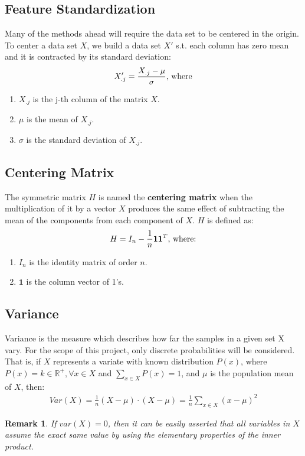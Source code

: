\documentclass[12pt]{report}
\newtheorem{remark}{Remark}[section]
\begin{document}
\subsection{Feature Standardization}
Many of the methods ahead will require the data set to be centered in the origin. To center a data set $X$, we build a data set $X'$ s.t. each column has zero mean and it is contracted by its standard deviation:
$$X'_{.j} = \frac{X_{.j} - \mu}{\sigma} \textnormal{, where}$$
\begin{enumerate}
	\item $X_{.j}$ is the j-th column of the matrix $X$.
	\item $\mu$ is the mean of $X_{.j}$.
	\item $\sigma$ is the standard deviation of $X_{.j}$.
\end{enumerate}

\subsection{Centering Matrix}
The symmetric matrix $H$ is named the \textbf{centering matrix} when the multiplication of it by a vector $X$ produces the same effect of subtracting the mean of the components from each component of $X$. $H$ is defined as:
$$
H = I_n - \frac{1}{n}\textbf{11}^T \textnormal{, where:}
$$
\begin{enumerate}
	\item $I_n$ is the identity matrix of order $n$.
	\item $\textbf{1}$ is the column vector of 1's.
\end{enumerate}

\subsection{Variance}
Variance is the measure which describes how far the samples in a given set X vary. For the scope of this project, only discrete probabilities will be considered. That is, if $X$ represents a variate with known distribution $P(x)$, where $P(x) = k \in \mathbb{R}^{+}, \forall x \in X$ and $\sum_{x \in X} P(x) = 1$, and $\mu$ is the population mean of $X$, then: \cite{ross2010introductory}
\begin{align*}
	Var(X) = \frac{1}{n} (X-\mu) \cdot (X-\mu) = \frac{1}{n} \sum_{x \in X} (x - \mu)^2
\end{align*}

\begin{remark}
	If $var(X) = 0$, then it can be easily asserted that all variables in $X$ assume the exact same value by using the elementary properties of the inner product.
\end{remark}
\end{document}
